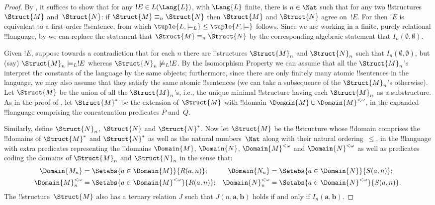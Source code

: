 \documentclass[../../../include/open-logic-section]{subfiles}
\begin{document}
\begin{proof}
By , it suffices to show that for any $!E
\in L(\Lang{L})$, with $\Lang{L}$ finite, there is $n \in \Nat$
such that for any two !!{structure}s $\Struct{M}$ and~$\Struct{N}$: if
$\Struct{M} \equiv_n \Struct{N}$ then $\Struct{M}$ and $\Struct{N}$
agree on~$!E$. For then $!E$ is equivalent to a first-order
!!{sentence}, from which $\tuple{L, \models_L} \le \tuple{F, \models}$
follows. Since we are working in a finite, purely relational
!!{language}, by  we can replace the statement
that $\Struct{M} \equiv_n \Struct{N}$ by the corresponding algebraic
statement that $I_n(\emptyset,\emptyset)$.

Given $!E$, suppose towards a contradiction that for each $n$ there
are !!{structure}s $\Struct{M}_n$ and $\Struct{N}_n$ such that
$I_n(\emptyset, \emptyset)$, but (say) $\Struct{M}_n \models_L !E$
whereas $\Struct{N}_n \not\models_L !E$. By the Isomorphism Property
we can assume that all the $\Struct{M}_n$'s interpret the constants of
the language by the same objects; furthermore, since there are only
finitely many atomic !!{sentence}s in the language, we may also assume
that they satisfy the same atomic !!{sentence}s (we can take a
subsequence of the $\Struct{M}_n$'s otherwise). Let $\Struct{M}$ be the
union of all the $\Struct{M}_n$'s, i.e., the unique minimal
!!{structure} having each $\Struct{M}_n$ as a substructure.  As in the
proof of , let $\Struct{M}^*$ be the
extension of $\Struct{M}$ with !!{domain} $\Domain{M} \cup
\Domain{M}^{<\omega}$, in the expanded !!{language} comprising the
concatenation predicates $P$ and~$Q$.

Similarly, define $\Struct{N}_n$, $\Struct{N}$ and $\Struct{N}^*$. Now
let $\Struct{M}$ be the !!{structure} whose !!{domain} comprises the
!!{domain}s of $\Struct{M}^*$ and $\Struct{N}^*$ as well as the natural
numbers~$\Nat$ along with their natural ordering~$\le$, in the
!!{language} with extra predicates representing the !!{domain}s
$\Domain{M}$, $\Domain{N}$, $\Domain{M}^{<\omega}$ and
$\Domain{N}^{<\omega}$ as well as predicates coding the domains of
$\Struct{M}_n$ and $\Struct{N}_n$ in the sense that:
\begin{align*}
  \Domain{M_n} & = \Setabs{a \in \Domain{M}}{R(a, n)}; & 
  \Domain{N_n} & = \Setabs{a \in \Domain{N}}{S(a,n)}; \\
  \Domain{M}^{<\omega}_n & = \Setabs{a \in \Domain{M}^{<\omega}}{R(a,n)}; &
  \Domain{N}^{<\omega}_n & = \Setabs{a \in \Domain{N}^{<\omega}}{S(a,n)}. 
\end{align*}
The !!{structure}~$\Struct{M}$ also has a ternary relation $J$ such
that $J(n, \mathbf{a}, \mathbf{b})$ holds if and only if
$I_n(\mathbf{a}, \mathbf{b})$.


\end{proof}
\end{document}
